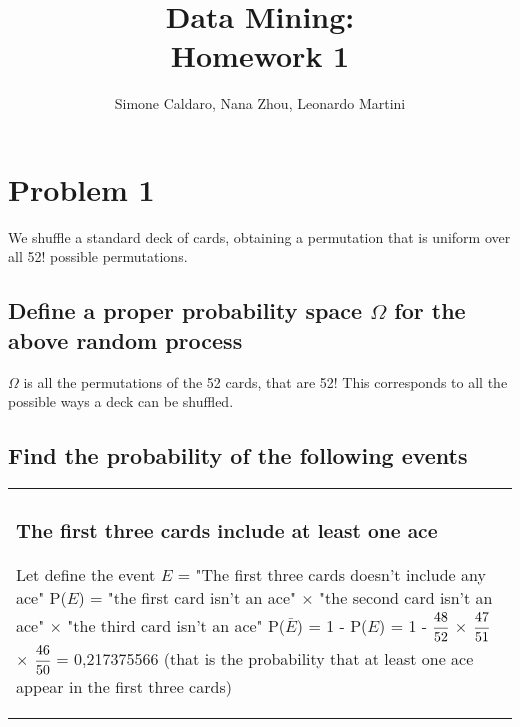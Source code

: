 \documentclass[oneside]{article}			%
\newenvironment{adjustwidth}{\begin{center}\begin{tabular}{p{0.9\textwidth}}		%

    }
    { 
    \end{tabular} 
    \end{center}
    }
\begin{document}
	\title{Data Mining:\\Homework 1}
	\author{Simone Caldaro, Nana Zhou, Leonardo Martini}

	\maketitle

	\pagestyle{plain}
	\tableofcontents		%
	\clearpage				%
	
	
	
	\section*{Problem 1}We shuffle a standard deck of cards, obtaining a permutation that is uniform over all 52! possible permutations.
	\subsection{Define a proper probability space $\Omega$ for the above random process}
	 	$\Omega$  is all the permutations of the 52 cards, that are 52! \newline 
		 This corresponds to all the possible ways a deck can be shuffled.

	\subsection{Find the probability of the following events}

	\begin{adjustwidth}
	\subsubsection{The first three cards include at least one ace} 
	Let define the event $\mathit{E}$ = "The first three cards doesn't include any ace" \newline
	P($\mathit{E}$) = "the first card isn't an ace" $\times$ "the second card isn't an ace" $\times$ "the third card isn't an ace" \newline
	P($\bar{E}$) = 1 - P($\mathit{E}$) = 1 - $\cfrac{48}{52}$ $\times$ $\cfrac{47}{51}$ $\times$ $\cfrac{46}{50}$ = 0,217375566 (that is the probability that at least one ace appear in the first three cards)
	
	\end{adjustwidth}
	
\end{document}
